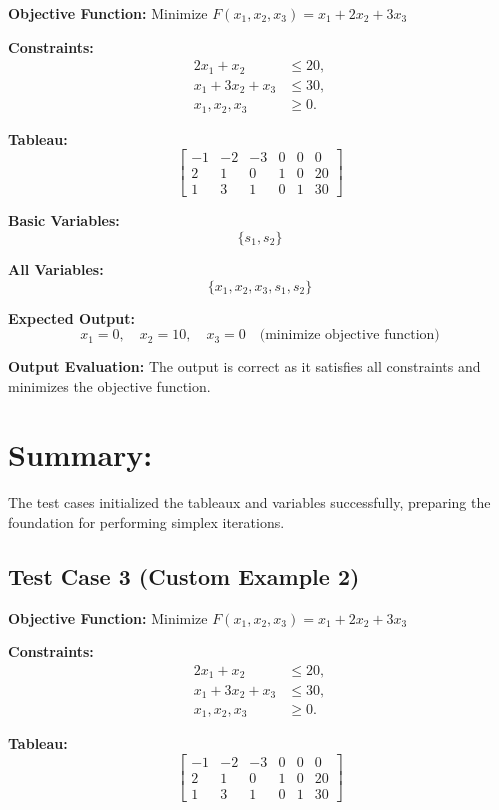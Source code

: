 \documentclass[12pt, legalpaper]{exam}
\begin{document}
\textbf{Objective Function:} Minimize \( F(x_1, x_2, x_3) = x_1 + 2x_2 + 3x_3 \)

\textbf{Constraints:}
\[
\begin{aligned}
2x_1 + x_2 &\leq 20, \\
x_1 + 3x_2 + x_3 &\leq 30, \\
x_1, x_2, x_3 &\geq 0.
\end{aligned}
\]

\textbf{Tableau:}
\[
\begin{bmatrix}
-1 & -2 & -3 & 0 & 0 & 0 \\
2 & 1 & 0 & 1 & 0 & 20 \\
1 & 3 & 1 & 0 & 1 & 30
\end{bmatrix}
\]

\textbf{Basic Variables:}
\[
\{ s_1, s_2 \}
\]

\textbf{All Variables:}
\[
\{ x_1, x_2, x_3, s_1, s_2 \}
\]

\textbf{Expected Output:}
\[
x_1 = 0, \quad x_2 = 10, \quad x_3 = 0 \quad \text{(minimize objective function)}
\]

\textbf{Output Evaluation:} The output is correct as it satisfies all constraints and minimizes the objective function.

\section*{Summary:}
The test cases initialized the tableaux and variables successfully, preparing the foundation for performing simplex iterations.

\subsection*{Test Case 3 (Custom Example 2)}

\textbf{Objective Function:} Minimize \( F(x_1, x_2, x_3) = x_1 + 2x_2 + 3x_3 \)

\textbf{Constraints:}
\[
\begin{aligned}
2x_1 + x_2 &\leq 20, \\
x_1 + 3x_2 + x_3 &\leq 30, \\
x_1, x_2, x_3 &\geq 0.
\end{aligned}
\]

\textbf{Tableau:}
\[
\begin{bmatrix}
-1 & -2 & -3 & 0 & 0 & 0 \\
2 & 1 & 0 & 1 & 0 & 20 \\
1 & 3 & 1 & 0 & 1 & 30
\end{bmatrix}
\]
\end{document}
